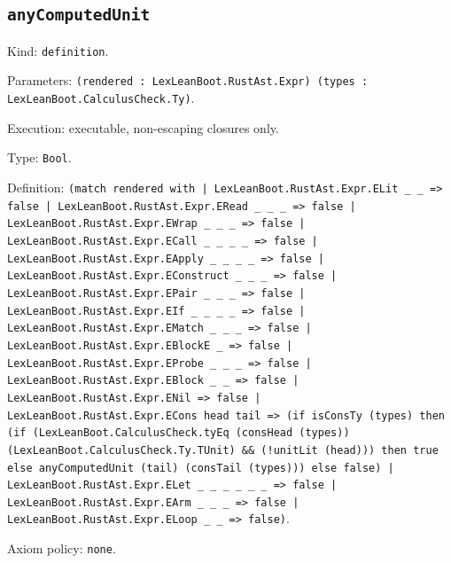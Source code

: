 \documentclass[11pt]{article}
\begin{document}
\subsection*{\texttt{anyComputedUnit}}
\noindent Kind: \texttt{definition}.\par
\noindent Parameters: \texttt{(rendered : LexLeanBoot.RustAst.Expr) (types : LexLeanBoot.CalculusCheck.Ty)}.\par
\noindent Execution: executable, non-escaping closures only.\par
\noindent Type: \texttt{Bool}.\par
\noindent Definition: \texttt{(match rendered with | LexLeanBoot.RustAst.Expr.ELit \_ \_ => false | LexLeanBoot.RustAst.Expr.ERead \_ \_ \_ => false | LexLeanBoot.RustAst.Expr.EWrap \_ \_ \_ => false | LexLeanBoot.RustAst.Expr.ECall \_ \_ \_ \_ => false | LexLeanBoot.RustAst.Expr.EApply \_ \_ \_ \_ => false | LexLeanBoot.RustAst.Expr.EConstruct \_ \_ \_ => false | LexLeanBoot.RustAst.Expr.EPair \_ \_ \_ => false | LexLeanBoot.RustAst.Expr.EIf \_ \_ \_ \_ => false | LexLeanBoot.RustAst.Expr.EMatch \_ \_ \_ => false | LexLeanBoot.RustAst.Expr.EBlockE \_ => false | LexLeanBoot.RustAst.Expr.EProbe \_ \_ \_ => false | LexLeanBoot.RustAst.Expr.EBlock \_ \_ => false | LexLeanBoot.RustAst.Expr.ENil => false | LexLeanBoot.RustAst.Expr.ECons head tail => (if isConsTy (types) then (if (LexLeanBoot.CalculusCheck.tyEq (consHead (types)) (LexLeanBoot.CalculusCheck.Ty.TUnit) \&\& (!unitLit (head))) then true else anyComputedUnit (tail) (consTail (types))) else false) | LexLeanBoot.RustAst.Expr.ELet \_ \_ \_ \_ \_ \_ => false | LexLeanBoot.RustAst.Expr.EArm \_ \_ \_ => false | LexLeanBoot.RustAst.Expr.ELoop \_ \_ => false)}.\par
\noindent Axiom policy: \texttt{none}.\par
\end{document}
